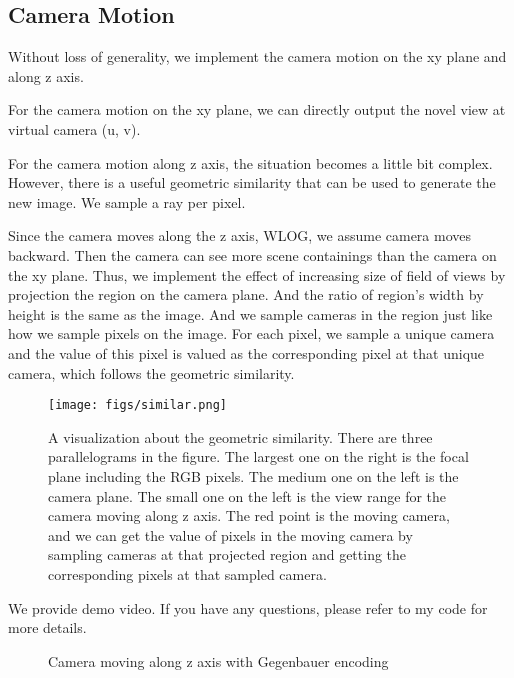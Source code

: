 \documentclass[acmtog]{acmart}
\begin{document}
\subsection{Camera Motion}
    \qquad Without loss of generality, we implement the camera motion on the xy plane and along z axis.

    \quad For the camera motion on the xy plane, we can directly output the novel view at virtual camera (u, v).

    \quad For the camera motion along z axis, the situation becomes a little bit complex. However, there is a useful geometric similarity that can be used to generate the new image. We sample a ray per pixel. 
    
    \quad Since the camera moves along the z axis, WLOG, we assume camera moves backward. Then the camera can see more scene containings than the camera on the xy plane. Thus, we implement the effect of increasing size of field of views by projection the region on the camera plane. And the ratio of region's width by height is the same as the image. And we sample cameras in the region just like how we sample pixels on the image. For each pixel, we sample a unique camera and the value of this pixel is valued as the corresponding pixel at that unique camera, which follows the geometric similarity.
\begin{figure}
    \centering
    \texttt{[image: figs/similar.png]}
    \caption{A visualization about the geometric similarity. There are three parallelograms in the figure. The largest one on the right is the focal plane including the RGB pixels. The medium one on the left is the camera plane. The small one on the left is the view range for the camera moving along z axis. The red point is the moving camera, and we can get the value of pixels in the moving camera by sampling cameras at that projected region and getting the corresponding pixels at that sampled camera.}
    \label{fig:my_label}
\end{figure}

    \quad We provide demo video. If you have any questions, please refer to my code for more details.

    \begin{figure}[h]
        \centering
        \quad
        \quad
        \quad
        \caption{Camera moving along z axis with Gegenbauer encoding}
    \end{figure}
    
\end{document}
